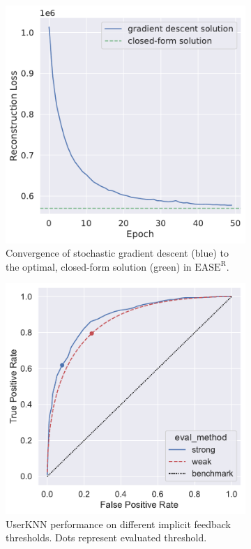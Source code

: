 \documentclass{article}
\newcommand{\easer}{$\text{EASE}^\text{R}$}
\newcommand{\userknn}{UserKNN\xspace}
\begin{document}
\begin{figure}[h]
	\centering
	\begin{subfigure}[b]{0.4\textwidth}
		\centering
		\includegraphics[width=\textwidth]{figures/recon-loss.pdf}
		\caption{Convergence of stochastic gradient descent (blue) to the optimal,
		closed-form solution (green) in \easer.}
		\label{fig:convergence}
	\end{subfigure}
	\hspace{0.1\textwidth}
	\begin{subfigure}[b]{0.4\textwidth}
		\centering
		\includegraphics[width=\textwidth]{figures/user_knn_roc.pdf}
		\caption{\userknn performance on different implicit feedback thresholds. Dots represent evaluated threshold.}
	\end{subfigure}
	\caption{}
	\label{fig:1}
\end{figure}
\end{document}
